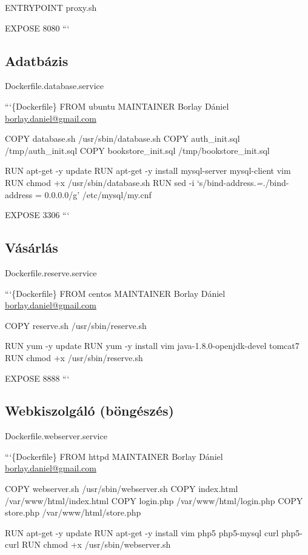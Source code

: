 \documentclass[11pt,magyar,a4paper,oneside,]{report}
\begin{document}
ENTRYPOINT proxy.sh

EXPOSE 8080 ```

\subsection{Adatbázis}\label{adatbuxe1zis}

Dockerfile.database.service

```\{Dockerfile\} FROM ubuntu MAINTAINER Borlay Dániel
\href{mailto:borlay.daniel@gmail.com}{borlay.daniel@gmail.com}

COPY database.sh /usr/sbin/database.sh COPY auth\_init.sql
/tmp/auth\_init.sql COPY bookstore\_init.sql /tmp/bookstore\_init.sql

RUN apt-get -y update RUN apt-get -y install mysql-server mysql-client
vim RUN chmod +x /usr/sbin/database.sh RUN sed -i
`s/bind-address.\emph{=.}/bind-address = 0.0.0.0/g' /etc/mysql/my.cnf

EXPOSE 3306 ```

\subsection{Vásárlás}\label{vuxe1suxe1rluxe1s}

Dockerfile.reserve.service

```\{Dockerfile\} FROM centos MAINTAINER Borlay Dániel
\href{mailto:borlay.daniel@gmail.com}{borlay.daniel@gmail.com}

COPY reserve.sh /usr/sbin/reserve.sh

RUN yum -y update RUN yum -y install vim java-1.8.0-openjdk-devel
tomcat7 RUN chmod +x /usr/sbin/reserve.sh

EXPOSE 8888 ```

\subsection{Webkiszolgáló
(böngészés)}\label{webkiszolguxe1luxf3-buxf6nguxe9szuxe9s}

Dockerfile.webserver.service

```\{Dockerfile\} FROM httpd MAINTAINER Borlay Dániel
\href{mailto:borlay.daniel@gmail.com}{borlay.daniel@gmail.com}

COPY webserver.sh /usr/sbin/webserver.sh COPY index.html
/var/www/html/index.html COPY login.php /var/www/html/login.php COPY
store.php /var/www/html/store.php

RUN apt-get -y update RUN apt-get -y install vim php5 php5-mysql curl
php5-curl RUN chmod +x /usr/sbin/webserver.sh
\end{document}
